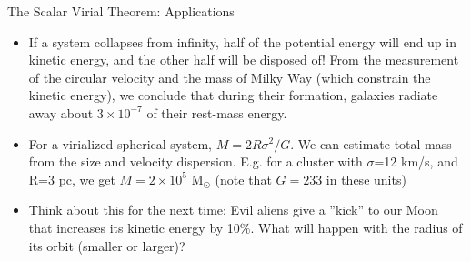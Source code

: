 \documentclass[letterpaper,landscape]{slides}
\begin{document}
\begin{slide}
	\begin{center}
		{\large \color{red} 
			The Scalar Virial Theorem: Applications  }
	\end{center}
	
	\begin{itemize}
		\item 
		If a system collapses from infinity, half of the potential
		energy will end up in kinetic energy, and the other half
		will be disposed of! From the measurement of the circular
		velocity and the mass of Milky Way (which constrain 
		the kinetic energy), we conclude that during their formation,
		galaxies radiate away about $3\times10^{-7}$ of their
		rest-mass energy.
		\item
		For a virialized spherical system, $M = 2 R \sigma^2 / G$. 
		We can estimate total mass from the size and velocity dispersion.
		E.g. for a cluster with $\sigma$=12 km/s, and R=3 pc, 
		we get $M = 2\times 10^5$ M$_\odot$ (note that $G=233$ in 
		these units)
		\item 
		{\color{red} Think about this for the next time:} Evil aliens
		give a ''kick'' to our Moon that increases its kinetic energy
		by 10\%. What will happen with the radius of its orbit (smaller or larger)? 
	\end{itemize}     
	
	\vfill
\end{slide}





\end{document}
